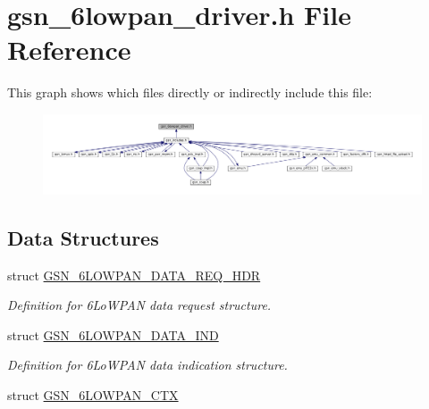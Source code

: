 \hypertarget{a00472}{
\section{gsn\_\-6lowpan\_\-driver.h File Reference}
\label{a00472}
}
This graph shows which files directly or indirectly include this file:
\nopagebreak
\begin{figure}[H]
\begin{center}
\leavevmode
\includegraphics[width=400pt]{a00695}
\end{center}
\end{figure}
\subsection*{Data Structures}
\begin{DoxyCompactItemize}
\item 
struct \hyperlink{a00021}{GSN\_\-6LOWPAN\_\-DATA\_\-REQ\_\-HDR}
\begin{DoxyCompactList}\small\item\em Definition for 6LoWPAN data request structure. \end{DoxyCompactList}\item 
struct \hyperlink{a00020}{GSN\_\-6LOWPAN\_\-DATA\_\-IND}
\begin{DoxyCompactList}\small\item\em Definition for 6LoWPAN data indication structure. \end{DoxyCompactList}\item 
struct \hyperlink{a00019}{GSN\_\-6LOWPAN\_\-CTX}
\end{DoxyCompactItemize}
